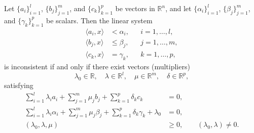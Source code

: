 \documentclass[../main]{subfiles}
\begin{document}
\begin{theorem}
    Let $\{a_i\}_{i=1}^{l}$, $\{b_j\}_{j=1}^{m}$, and $\{c_k\}_{k=1}^{p}$ be vectors in $\mathbb{R}^n$, and let $\{\alpha_i\}_{i=1}^{l}$, $\{\beta_j\}_{j=1}^{m}$, and $\{\gamma_k\}_{k=1}^{p}$ be scalars.  
    Then the linear system
    \begin{equation}
    \begin{aligned}
        \langle a_i, x \rangle &< \alpha_i, && i = 1, \ldots, l,\\
        \langle b_j, x \rangle &\le \beta_j, && j = 1, \ldots, m,\\
        \langle c_k, x \rangle &= \gamma_k, && k = 1, \ldots, p,
    \end{aligned}
    \tag{3.7}
    \end{equation}
    is inconsistent if and only if there exist vectors (multipliers) 
    \begin{equation}
        \lambda_0 \in \mathbb{R},\quad 
    \lambda \in \mathbb{R}^{l},\quad 
    \mu \in \mathbb{R}^{m},\quad 
    \delta \in \mathbb{R}^{p},
    \end{equation}
    satisfying
    \begin{equation}
    \begin{aligned}
        \sum_{i=1}^{l} \lambda_i a_i 
        + \sum_{j=1}^{m} \mu_j b_j 
        + \sum_{k=1}^{p} \delta_k c_k &= 0,\\[4pt]
        \sum_{i=1}^{l} \lambda_i \alpha_i 
        + \sum_{j=1}^{m} \mu_j \beta_j 
        + \sum_{k=1}^{p} \delta_k \gamma_k 
        + \lambda_0 &= 0,\\[4pt]
        (\lambda_0, \lambda, \mu) &\ge 0,\qquad
        (\lambda_0, \lambda) \ne 0.
    \end{aligned}
    \tag{3.8}
    \end{equation}
    \end{theorem}
\end{document}
